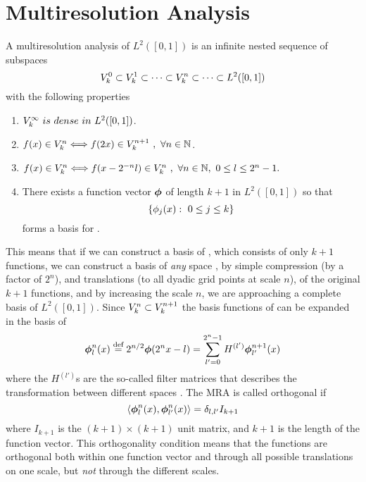 \section{Multiresolution Analysis}
A multiresolution analysis of $L^2([0,1])$ is an infinite nested sequence of subspaces
\begin{equation}
    \label{eq:MRA}
    {V}_{k}^{0}\subset {V}_{k}^{1}\subset \cdots \subset 
	{V}_{k}^{n}\subset \cdots \subset L^2([0,1])
\end{equation}
with the following properties
\begin{enumerate}
    \item $\scalingspace{\infty}\ is\ dense\ in\ L^2([0,1])$.
    \item $f(x) \in {V}_{k}^{n} \Longleftrightarrow f(2x) \in {V}_{k}^{n+1}
    	\ ,\ \forall n \in \mathbb{N}$.
    \item $f(x) \in {V}_{k}^{n} \Longleftrightarrow f(x-2^{-n}l) \in {V}_{k}^{n}
	\ ,\ \forall n \in \mathbb{N},\ 0 \leq l \leq 2^n - 1.$
    \item There exists a function vector $\boldsymbol{\phi}$ of length $k+1$ in 
	$L^2([0,1])$ so that \[\lbrace \phi_j(x):\  0\leq j\leq k \rbrace\] 
	forms a basis for . 
\end{enumerate}
This means that if we can construct a basis of , which consists of only
$k+1$ functions, we can construct a basis of \emph{any} space , by
simple compression (by a factor of $2^n$), and translations (to all dyadic
grid points at scale $n$), of the original $k+1$ functions, and by increasing
the scale $n$, we are approaching a complete basis of $L^2([0,1])$. Since ${V}_{k}^{n}
\subset {V}_{k}^{n+1}$ the basis functions of  can be expanded in the 
basis of 
\begin{equation}
    \label{eq:twoscalescaling}
    \boldsymbol{\phi}^n_l(x) \stackrel{\text{def}}{\hbox{=}} 2^{n/2}\boldsymbol{\phi}(2^nx-l) = 
	\sum_{l'=0}^{2^n-1} H^{(l')} \boldsymbol{\phi}^{n+1}_{l'}(x)
\end{equation}
where the $H^{(l')}$s are the so-called filter matrices that describes the 
transformation between different spaces . The MRA is called orthogonal if 
\begin{equation}
    \label{eq:orthogonality}
    \langle \boldsymbol{\phi}_l^n(x), \boldsymbol{\phi}_{l'}^n(x) \rangle = \delta_{l,l'}I_{k+1}
\end{equation}
where $I_{k+1}$ is the $(k+1) \times (k+1)$ unit matrix, and $k+1$ is the 
length of the function vector. This orthogonality condition means that the 
functions are orthogonal both within one function vector and through all 
possible translations on one scale, but \emph{not} through the different scales.

